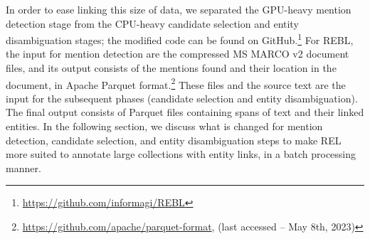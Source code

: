 In order to ease linking this size of data, we separated the GPU-heavy mention detection stage from the CPU-heavy candidate selection and entity disambiguation stages; the modified code can be found on GitHub.\footnote{\url{https://github.com/informagi/REBL}}
For REBL, the input for mention detection are the compressed MS MARCO v2 document files, and its output consists of the mentions found and their location in the document, in Apache Parquet format.\footnote{\url{https://github.com/apache/parquet-format}, (last accessed -- May 8th, 2023)}
These files and the source text are the input for the subsequent phases (candidate selection and entity disambiguation). The final output consists of Parquet files containing spans of text and their linked entities. 
In the following section, we discuss what is changed for mention detection, candidate selection, and entity disambiguation steps to make REL more suited to annotate large collections with entity links, in a batch processing manner.  

